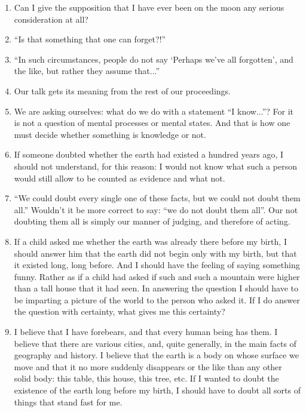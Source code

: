 \documentclass{book}
\begin{document}
\begin{enumerate}
\item
Can I give the supposition that I have ever been on the moon any serious
consideration at all?

\item
``Is that something that one can forget?!''

\item
``In such circumstances, people do not say `Perhaps we've all forgotten', and
the like, but rather they assume that...''

\item
Our talk gets its meaning from the rest of our proceedings.

\item
We are asking ourselves: what do we do with a statement ``I know...''? For it
is not a question of mental processes or mental states.  And that is how one
must decide whether something is knowledge or not.

\item
If someone doubted whether the earth had existed a hundred years ago, I should
not understand, for this reason: I would not know what such a person would
still allow to be counted as evidence and what not.

\item
``We could doubt every single one of these facts, but we could not doubt them
all.'' Wouldn't it be more correct to say: ``we do not doubt them all''.  Our
not doubting them all is simply our manner of judging, and therefore of acting.

\item
If a child asked me whether the earth was already there before my birth, I
should answer him that the earth did not begin only with my birth, but that it
existed long, long before. And I should have the feeling of saying something
funny. Rather as if a child had asked if such and such a mountain were higher
than a tall house that it had seen. In answering the question I should have to
be imparting a picture of the world to the person who asked it.  If I do answer
the question with certainty, what gives me this certainty?

\item
I believe that I have forebears, and that every human being has them. I believe
that there are various cities, and, quite generally, in the main facts of
geography and history. I believe that the earth is a body on whose surface we
move and that it no more suddenly disappears or the like than any other solid
body: this table, this house, this tree, etc. If I wanted to doubt the
existence of the earth long before my birth, I should have to doubt all sorts
of things that stand fast for me.


\end{enumerate}
\end{document}
